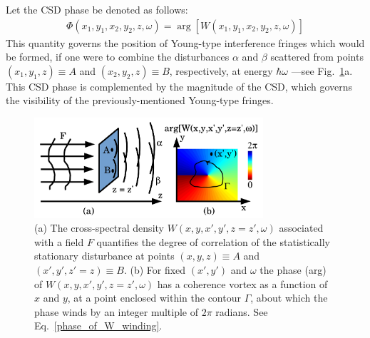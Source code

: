 \documentclass[%
 reprint,
 amsmath,amssymb,
 aps,
]{revtex4-1}
\begin{document}
Let the CSD phase be denoted as follows:
\begin{equation}
\begin{aligned}
\label{phase_of_W}
\Phi(x_1,y_1,x_2,y_2,z,\omega)=\arg[W(x_1,y_1,x_2,y_2,z,\omega)]
\end{aligned}
\end{equation}
This quantity governs the position of Young-type interference fringes which would be formed, if one were to combine the disturbances $\alpha$ and $\beta$ scattered from points $(x_1,y_1,z)\equiv A$ and $(x_2,y_2,z)\equiv B$, respectively, at energy $\hbar\omega$ \cite{mandel_wolf}---see Fig.~\ref{loss_of_fringe_visibility}a. This CSD phase is complemented by the magnitude of the CSD, which governs the visibility of the previously-mentioned Young-type fringes.

\begin{figure}
\includegraphics[width=8.5cm]{Figures/coherence_vortex.png}
\caption{(a) The cross-spectral density $W(x,y,x',y',z=z',\omega)$ associated with a field $F$ quantifies the degree of correlation of the statistically stationary disturbance at points $(x,y,z)\equiv A$ and $(x',y',z'=z)\equiv B$. (b) For fixed $(x',y')$ and $\omega$ the phase (arg) of $W(x,y,x',y',z=z',\omega)$ has a coherence vortex as a function of $x$ and $y$, at a point enclosed within the contour $\Gamma$, about which the phase winds by an integer multiple of $2\pi$ radians.  See Eq.~\ref{phase_of_W_winding}.}
\label{loss_of_fringe_visibility}
\end{figure}
\end{document}
